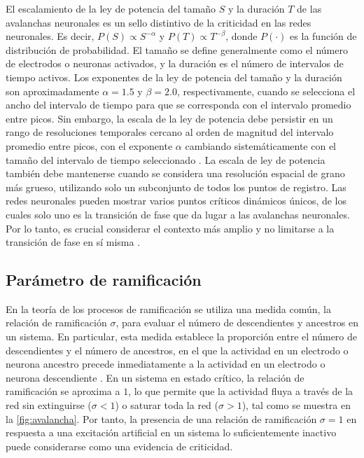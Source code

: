 El escalamiento de la ley de potencia del tamaño $S$ y la duración $T$ de las avalanchas neuronales es un sello distintivo de la criticidad en las redes neuronales. Es decir, $P(S) \propto S^{-\alpha}$  y $P(T) \propto T^{-\beta}$, donde $P(·)$  es la función de distribución de probabilidad. El tamaño se define generalmente como el número de electrodos o neuronas activados, y la duración es el número de intervalos de tiempo activos. Los exponentes de la ley de potencia del tamaño y la duración son aproximadamente $\alpha=1.5$ y $\beta= 2.0$, respectivamente, cuando se selecciona el ancho del intervalo de tiempo para que se corresponda con el intervalo promedio entre picos. Sin embargo, la escala de la ley de potencia debe persistir en un rango de resoluciones temporales cercano al orden de magnitud del intervalo promedio entre picos, con el exponente $\alpha$ cambiando sistemáticamente con el tamaño del intervalo de tiempo seleccionado \cite{beggs_neuronal_2003,pasquale_self-organization_2008}. La escala de ley de potencia también debe mantenerse cuando se considera una resolución espacial de grano más grueso, utilizando solo un subconjunto de todos los puntos de registro. Las redes neuronales pueden mostrar varios puntos críticos dinámicos únicos, de los cuales solo uno es la transición de fase que da lugar a las avalanchas neuronales. Por lo tanto, es crucial considerar el contexto más amplio y no limitarse a la transición de fase en sí misma \cite{kanders_avalanche_2017}.







\subsection{Parámetro de ramificación}



En la teoría de los procesos de ramificación \cite{harris_theory_1963} se utiliza una medida común, la relación de ramificación $\sigma$, para evaluar el número de descendientes y ancestros en un sistema. En particular, esta medida establece la proporción entre el número de descendientes y el número de ancestros, en el que la actividad en un electrodo o neurona ancestro precede inmediatamente a la actividad en un electrodo o neurona descendiente \cite{beggs_neuronal_2003}. En un sistema en estado crítico, la relación de ramificación se aproxima a $1$, lo que permite que la actividad fluya a través de la red sin extinguirse ($\sigma < 1$) o saturar toda la red ($\sigma > 1$), tal como se muestra en la \cref{fig:avalancha}. Por tanto, la presencia de una relación de ramificación $\sigma = 1$ en respuesta a una excitación artificial en un sistema lo suficientemente inactivo puede considerarse como una evidencia de criticidad.\\

